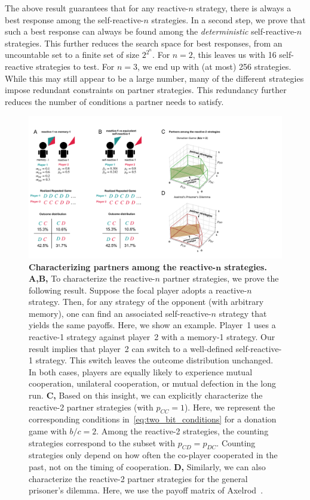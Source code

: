 \documentclass[9pt,twocolumn,twoside]{pnas-new}
\begin{document}
The above result guarantees that for any reactive-$n$ strategy, there is always a best response among the self-reactive-$n$ strategies. 
In a second step, we prove that such a best response can always be found among the {\it deterministic} self-reactive-$n$ strategies. 
This further reduces the search space for best responses, from an uncountable set to a finite set of size $2^{2^n}$. 
For $n\!=\!2$, this leaves us with 16 self-reactive strategies to test. 
For $n\!=\!3$, we end up with (at most) 256 strategies. 
While this may still appear to be a large number, many of the different strategies impose redundant constraints on partner strategies.
This redundancy further reduces the number of conditions a partner needs to satisfy.\\

\begin{figure}[t]
       \centering
       \includegraphics[width=.95\textwidth]{../../figures/conceptual_figure_results.pdf}
       \caption{
       \textbf{Characterizing partners among the reactive-$\boldsymbol n$ strategies.} 
       {\bf A,B,} To characterize the reactive-$n$ partner strategies, we prove the following result. 
       Suppose the focal player adopts a reactive-$n$ strategy. 
       Then, for any strategy of the opponent (with arbitrary memory), one can find an associated self-reactive-$n$ strategy that yields the same payoffs. 
       Here, we show an example. 
       Player~1 uses a reactive-1 strategy against player~2 with a memory-1 strategy. 
       Our result implies that player~2 can switch to a well-defined self-reactive-1 strategy. 
       This switch leaves the outcome distribution unchanged.
       In both cases, players are equally likely to experience mutual cooperation, unilateral cooperation, or mutual defection in the long run. 
       \textbf{C,} Based on this insight, we can explicitly characterize the reactive-2 partner strategies (with $p_{CC}\!=\!1$). 
       Here, we represent the corresponding conditions in~\eqref{eq:two_bit_conditions} for a donation game with $b/c\!=\!2$. 
       Among the reactive-2 strategies, the counting strategies correspond to the subset with $p_{CD}\!=\!p_{DC}$. 
       Counting strategies only depend on how often the co-player cooperated in the past, not on the timing of cooperation.
       \textbf{D,} Similarly, we can also characterize the reactive-2 partner strategies for the general prisoner's dilemma. 
       Here, we use the payoff matrix of Axelrod~\citep{axelrod:AAAS:1981}.
       }\label{fig:conceptual_figure_results}
\end{figure}
\end{document}
